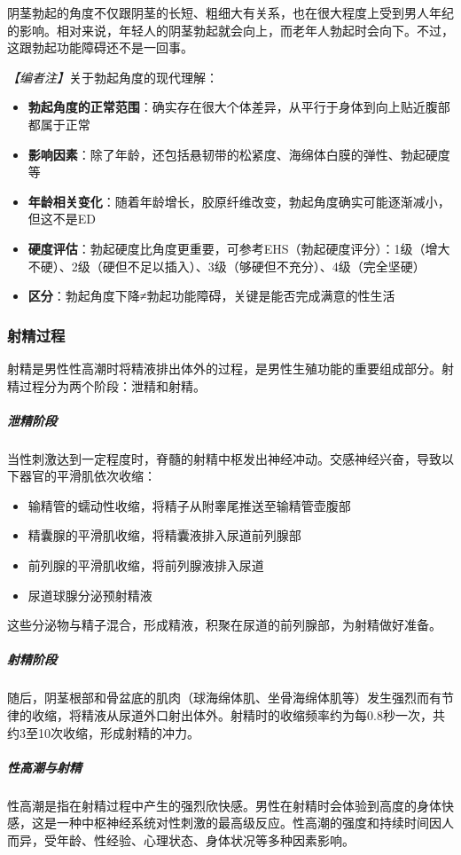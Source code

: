 阴茎勃起的角度不仅跟阴茎的长短、粗细大有关系，也在很大程度上受到男人年纪的影响。相对来说，年轻人的阴茎勃起就会向上，而老年人勃起时会向下。不过，这跟勃起功能障碍还不是一回事。

\noindent\textit{【编者注】}关于勃起角度的现代理解：
\begin{itemize}
	\item \textbf{勃起角度的正常范围}：确实存在很大个体差异，从平行于身体到向上贴近腹部都属于正常
	\item \textbf{影响因素}：除了年龄，还包括悬韧带的松紧度、海绵体白膜的弹性、勃起硬度等
	\item \textbf{年龄相关变化}：随着年龄增长，胶原纤维改变，勃起角度确实可能逐渐减小，但这不是ED
	\item \textbf{硬度评估}：勃起硬度比角度更重要，可参考EHS（勃起硬度评分）：1级（增大不硬）、2级（硬但不足以插入）、3级（够硬但不充分）、4级（完全坚硬）
	\item \textbf{区分}：勃起角度下降≠勃起功能障碍，关键是能否完成满意的性生活
\end{itemize}

\subsubsection{射精过程}

射精是男性性高潮时将精液排出体外的过程，是男性生殖功能的重要组成部分。射精过程分为两个阶段：泄精和射精。

\subparagraph{泄精阶段}

当性刺激达到一定程度时，脊髓的射精中枢发出神经冲动。交感神经兴奋，导致以下器官的平滑肌依次收缩：
\begin{itemize}
    \item 输精管的蠕动性收缩，将精子从附睾尾推送至输精管壶腹部
    \item 精囊腺的平滑肌收缩，将精囊液排入尿道前列腺部
    \item 前列腺的平滑肌收缩，将前列腺液排入尿道
    \item 尿道球腺分泌预射精液
\end{itemize}
这些分泌物与精子混合，形成精液，积聚在尿道的前列腺部，为射精做好准备。

\subparagraph{射精阶段}

随后，阴茎根部和骨盆底的肌肉（球海绵体肌、坐骨海绵体肌等）发生强烈而有节律的收缩，将精液从尿道外口射出体外。射精时的收缩频率约为每0.8秒一次，共约3至10次收缩，形成射精的冲力。

\subparagraph{性高潮与射精}

性高潮是指在射精过程中产生的强烈欣快感。男性在射精时会体验到高度的身体快感，这是一种中枢神经系统对性刺激的最高级反应。性高潮的强度和持续时间因人而异，受年龄、性经验、心理状态、身体状况等多种因素影响。

